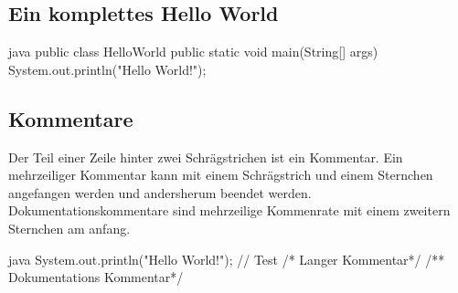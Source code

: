 \documentclass{article}
\begin{document}
\subsection{Ein komplettes Hello World}
\begin{sourcecode}{java}
public class HelloWorld {
    public static void main(String[] args) {
        System.out.println("Hello World!");
    }
}
\end{sourcecode}

\subsection{Kommentare}
Der Teil einer Zeile hinter zwei Schrägstrichen ist ein Kommentar. Ein mehrzeiliger Kommentar kann mit einem Schrägstrich und einem Sternchen angefangen werden und andersherum beendet werden. Dokumentationskommentare sind mehrzeilige Kommenrate mit einem zweitern Sternchen am anfang.
\begin{sourcecode}{java}
System.out.println("Hello World!"); // Test
/* Langer
   Kommentar*/
/** Dokumentations
   Kommentar*/
\end{sourcecode}
\end{document}
